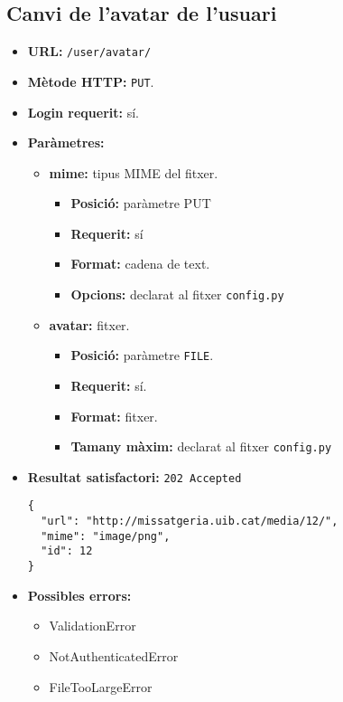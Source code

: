 \subsection{Canvi de l'avatar de l'usuari}
\begin{itemize}
\item \textbf{\ac{URL}:} \texttt{/user/avatar/}
\item \textbf{Mètode \ac{HTTP}: } \texttt{PUT}.
\item \textbf{Login requerit:} sí.
\item \textbf{Paràmetres:} 
	\begin{itemize}
		\item \textbf{mime:} tipus \ac{MIME} del fitxer.
		\begin{itemize}
			\item \textbf{Posició:} paràmetre \ac{PUT}
			\item \textbf{Requerit:} sí
			\item \textbf{Format:} cadena de text.
			\item \textbf{Opcions:} declarat al fitxer \texttt{config.py}
		\end{itemize}
		\item \textbf{avatar:} fitxer.
		\begin{itemize}
			\item \textbf{Posició:} paràmetre \texttt{FILE}.
			\item \textbf{Requerit:} sí.
			\item \textbf{Format:} fitxer.
			\item \textbf{Tamany màxim:} declarat al fitxer \texttt{config.py}

		\end{itemize}
	\end{itemize}

\item \textbf{Resultat satisfactori:} \texttt{202 Accepted}
	\begin{verbatim}
{
  "url": "http://missatgeria.uib.cat/media/12/",
  "mime": "image/png",
  "id": 12
}
	\end{verbatim}
	

\item \textbf{Possibles errors:}
	\begin{itemize}
		\item ValidationError
		\item NotAuthenticatedError
		\item FileTooLargeError
	\end{itemize}
\end{itemize}

